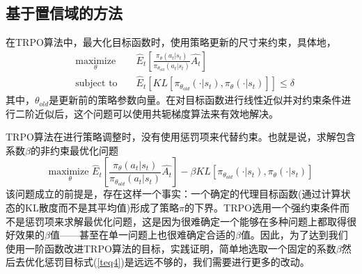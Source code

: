 \documentclass[bachelor]{thesis-uestc}
\begin{document}
	\subsection{基于置信域的方法}
	在TRPO算法中，最大化目标函数时，使用策略更新的尺寸来约束，具体地，
	\begin{equation*}
	\label{teq3}
	\begin{aligned}
		& \underset{\theta}{\text{maximize}}& & \hat{E}_t[\frac{\pi_\theta(a_t|s_t)}{\pi_{\theta_{old}}(a_t|s_t)}\hat{A_t}]\\
		& \text{subject to }& &\hat{E}_t[KL[\pi_{\theta_{old}}(\cdot|s_t),\pi_\theta(\cdot|s_t)]]\leq \delta
	\end{aligned}
	\end{equation*}
	其中，$\theta_{old}$是更新前的策略参数向量。在对目标函数进行线性近似并对约束条件进行二阶近似后，这个问题可以使用共轭梯度算法来有效地解决。
	
	TRPO算法在进行策略调整时，没有使用惩罚项来代替约束。也就是说，求解包含系数$\beta$的非约束最优化问题
	\begin{equation}
		\label{teq4}
		\underset{\theta}{\text{maximize }} \hat{E}_t[\frac{\pi_\theta(a_t|s_t)}{\pi_{\theta_{old}}(a_t|s_t)}\hat{A_t}]-\beta KL[\pi_{\theta_{old}}(\cdot|s_t),\pi_\theta(\cdot|s_t)]
	\end{equation}
	该问题成立的前提是，存在这样一个事实：一个确定的代理目标函数(通过计算状态的KL散度而不是其平均值)形成了策略$\pi$的下界。TRPO选用一个强约束条件而不是惩罚项来求解最优化问题，这是因为很难确定一个能够在多种问题上都取得很好效果的$\beta$值——甚至在单一问题上也很难确定合适的$\beta$值。因此，为了达到我们使用一阶函数改进TRPO算法的目标，实践证明，简单地选取一个固定的系数$\beta$然后去优化惩罚目标式(\ref{teq4})是远远不够的，我们需要进行更多的改动。
\end{document}

